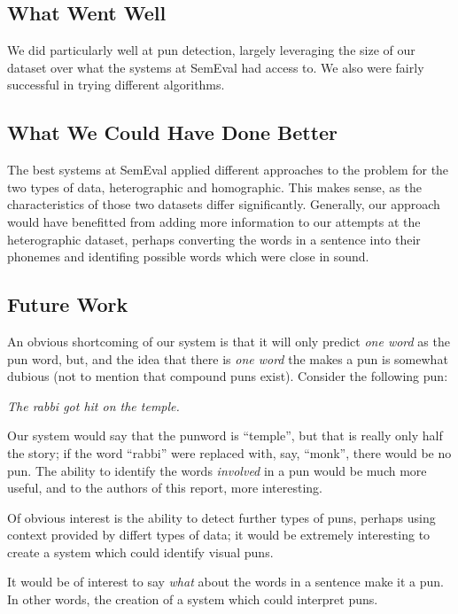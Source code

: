 \documentclass{article}
\begin{document}
\subsection{What Went Well}

We did particularly well at pun detection, largely leveraging the size of our
dataset over what the systems at SemEval had access to. We also were fairly
successful in trying different algorithms. 

\subsection{What We Could Have Done Better}

The best systems at SemEval applied different approaches to the problem for the
two types of data, heterographic and homographic. This makes sense, as the
characteristics of those two datasets differ significantly. Generally, our
approach would have benefitted from adding more information to our attempts at
the heterographic dataset, perhaps converting the words in a sentence into their
phonemes and identifing possible words which were close in sound.

\subsection{Future Work}

An obvious shortcoming of our system is that it will only predict \emph{one
word} as the pun word, but, and the idea that there is \emph{one word} the makes
a pun is somewhat dubious (not to mention that compound puns exist). Consider
the following pun: 
\begin{center}
	\emph{The rabbi got hit on the temple.}
\end{center}
Our system would say that the punword is ``temple'', but that is really only half
the story; if the word ``rabbi'' were replaced with, say, ``monk'', there would
be no pun. The ability to identify the words \emph{involved} in a pun would be
much more useful, and to the authors of this report, more interesting.

Of obvious interest is the ability to detect further types of puns, perhaps
using context provided by differt types of data; it would be extremely
interesting to create a system which could identify visual puns. 

It would be of interest to say \emph{what} about the words in a sentence make it
a pun. In other words, the creation of a system which could interpret puns.
\end{document}
